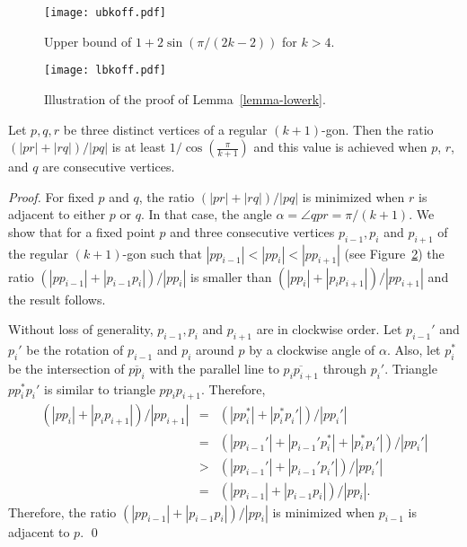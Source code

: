 \documentclass[pdftex,leqno,fleqn,12pts]{llncs}
\begin{document}
\begin{figure}
\centering\texttt{[image: ubkoff.pdf]}
\caption{Upper bound of $1+2\sin(\pi/(2k-2))$ for $k>4$.}
\label{fig-ubkoff}
\end{figure}

\begin{figure}
\centering\texttt{[image: lbkoff.pdf]}
\caption{Illustration of the proof of Lemma~\ref{lemma-lowerk}.}
\label{fig-lbkoff}
\end{figure}

\begin{lemma}\label{lemma-lowerk} Let $p,q,r$ be three distinct vertices of a regular $(k+1)$-gon. 
Then the ratio $(|pr|+|rq|)/|pq|$ is at least $1/ \cos(\frac{\pi}{k+1})$ and this value is achieved  
when $p$, $r$, and $q$ are consecutive vertices. 
\end{lemma}
\begin{proof} 
For fixed $p$ and $q$, the ratio $(|pr|+|rq|)/|pq|$ is minimized
when $r$ is adjacent to either $p$ or $q$. In that case, the angle $\alpha=\angle qpr=\pi/(k+1)$.
We show that for a fixed point $p$ and three consecutive vertices $p_{i-1},p_i$ and $p_{i+1}$
of the regular $(k+1)$-gon such that $|pp_{i-1}|<|pp_i|<|pp_{i+1}|$ (see Figure~\ref{fig-lbkoff})
the ratio $(|pp_{i-1}|+|p_{i-1}p_i|)/|pp_i|$ is smaller than $(|pp_i|+|p_{i}p_{i+1}|)/|pp_{i+1}|$ and
the result follows.

Without loss of generality, $p_{i-1},p_i$ and $p_{i+1}$ are in clockwise order. Let $p_{i-1}'$ and $p_i'$
be the rotation of $p_{i-1}$ and $p_i$ around $p$ by a clockwise angle of $\alpha$. Also, let $p_i^*$
be the intersection of $\overline{pp_i}$ with the parallel line to $\overline{p_ip_{i+1}}$ 
through $p_i'$. Triangle $pp_i^*p_i'$ is similar to triangle $pp_ip_{i+1}$.
Therefore, 
\begin{eqnarray*}
 (|pp_i|+|p_{i}p_{i+1}|)/|pp_{i+1}| & = & (|pp_i^*|+|p_i^*p_{i}'|)/|pp_{i}'| \\
                                    & = & (|pp_{i-1}'|+|p_{i-1}'p_i^*| +|p_i^*p_{i}'|)/|pp_{i}'|  \\
                                    & > & (|pp_{i-1}'|+|p_{i-1}'p_i'|)/|pp_i'|\\
                                    & = & (|pp_{i-1}|+|p_{i-1}p_i|)/|pp_i|.
\end{eqnarray*}
Therefore, the ratio $(|pp_{i-1}|+|p_{i-1}p_i|)/|pp_i|$ is minimized when $p_{i-1}$ is adjacent to $p$. 
\qed 
\end{proof}
\end{document}
